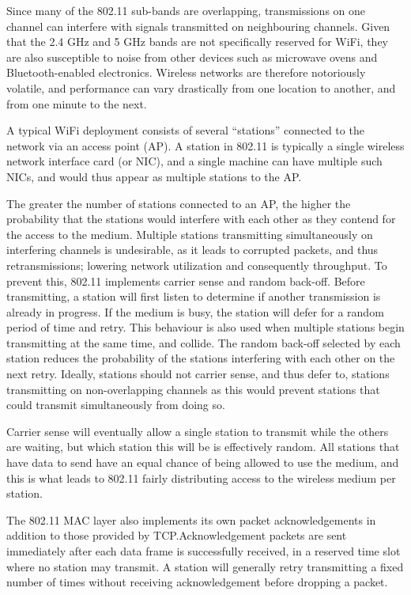 Since many of the 802.11 sub-bands are overlapping, transmissions on one channel
can interfere with signals transmitted on neighbouring channels. Given that the
2.4 GHz and 5 GHz bands are not specifically reserved for WiFi, they are also
susceptible to noise from other devices such as microwave ovens and
Bluetooth-enabled electronics. Wireless networks are therefore notoriously
volatile, and performance can vary drastically from one location to another, and
from one minute to the next.

A typical WiFi deployment consists of several ``stations'' connected to the
network via an access point (AP). A station in 802.11 is typically a single
wireless network interface card (or NIC), and a single machine can have multiple
such NICs, and would thus appear as multiple stations to the AP.

The greater the number of stations connected to an AP, the higher the
probability that the stations would interfere with each other as they contend
for the access to the medium. Multiple stations transmitting simultaneously on
interfering channels is undesirable, as it leads to corrupted packets, and thus
retransmissions; lowering network utilization and consequently throughput. To
prevent this, 802.11 implements carrier sense and random back-off. Before
transmitting, a station will first listen to determine if another transmission
is already in progress. If the medium is busy, the station will defer for a
random period of time and retry. This behaviour is also used when multiple
stations begin transmitting at the same time, and collide. The random back-off
selected by each station reduces the probability of the stations interfering
with each other on the next retry. Ideally, stations should not carrier sense,
and thus defer to, stations transmitting on non-overlapping channels as this
would prevent stations that could transmit simultaneously from doing so.

Carrier sense will eventually allow a single station to transmit while the
others are waiting, but which station this will be is effectively random. All
stations that have data to send have an equal chance of being allowed to use the
medium, and this is what leads to 802.11 fairly distributing access to the
wireless medium per station.

The 802.11 MAC layer also implements its own packet acknowledgements in addition
to those provided by TCP.\@ Acknowledgement packets are sent immediately after
each data frame is successfully received, in a reserved time slot where no
station may transmit. A station will generally retry transmitting a fixed number
of times without receiving acknowledgement before dropping a packet.

